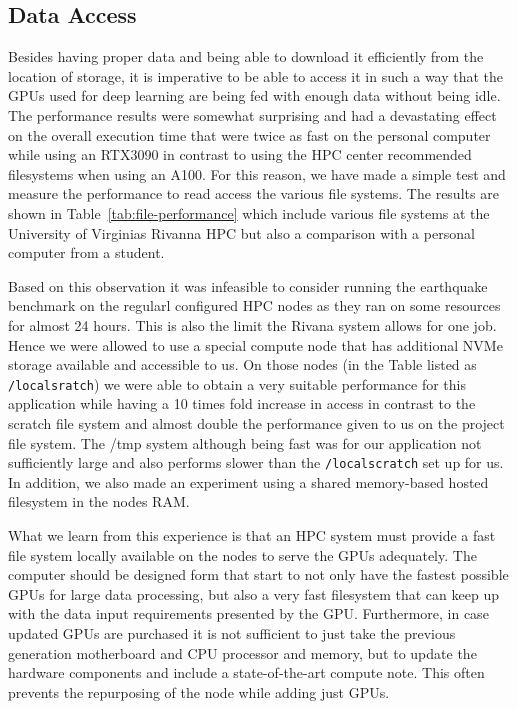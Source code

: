 \documentclass[utf8]{FrontiersinVancouver} %
\begin{document}
\subsection{Data Access}

Besides having proper data and being able to download it efficiently
from the location of storage, it is imperative to be able to access it
in such a way that the GPUs used for deep learning are being fed with
enough data without being idle. The performance results were somewhat
surprising and had a devastating effect on the overall execution time
that were twice as fast on the personal computer while using an
RTX3090 in contrast to using the HPC center recommended filesystems
when using an A100. For this reason, we have made a simple test and
measure the performance to read access the various file systems. The
results are shown in Table~\ref{tab:file-performance} which include
various file systems at the University of Virginias Rivanna HPC but also a
comparison with a personal computer from a student.

Based on this observation it was infeasible to consider running the
earthquake benchmark on the regularl configured HPC nodes as they ran
on some resources for almost 24 hours. This is also the limit the
Rivana system allows for one job. Hence we were allowed to use a
special compute node that has additional NVMe storage available and
accessible to us. On those nodes (in the Table listed as
\verb|/localsratch|) we were able to obtain a very suitable performance
for this application while having a 10 times fold increase in access in
contrast to the scratch file system and almost double the performance
given to us on the project file system. The /tmp system although being
fast was for our application not sufficiently large and also performs
slower than the \verb|/localscratch| set up for us. In addition, we
also made an experiment using a shared memory-based hosted filesystem
in the nodes RAM.


What we learn from this experience is that an HPC system must provide
a fast file system locally available on the nodes to serve the GPUs
adequately. The computer should be designed form that start to not
only have the fastest possible GPUs for large data processing, but
also a very fast filesystem that can keep up with the data input
requirements presented by the GPU. Furthermore, in case updated GPUs
are purchased it is not sufficient to just take the previous
generation motherboard and CPU processor and memory, but to update the
hardware components and include a state-of-the-art compute note. This
often prevents the repurposing of the node while adding just GPUs.
\end{document}
